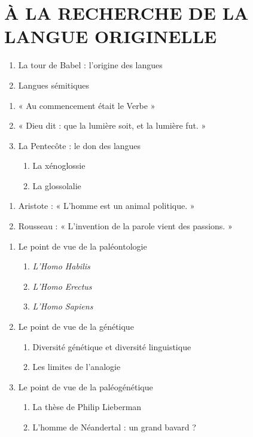 \chapter{À LA RECHERCHE DE LA LANGUE ORIGINELLE}
\begingroup\small{}\setlength{\parskip}{2pt}
\begin{enumerate}[label=\arabic*.]
\item La tour de Babel : l’origine des langues
\item Langues sémitiques
\end{enumerate}
\begin{enumerate}[label=\arabic*.]
\item « Au commencement était le Verbe »
\item « Dieu dit : que la lumière soit, et la lumière fut. »
\item La Pentecôte : le don des langues
\begin{enumerate}[label=\textbf{\arabic*},nosep]
\item La xénoglossie
\item La glossolalie
\end{enumerate}
\end{enumerate}
\begin{enumerate}[label=\arabic*.]
\item Aristote : « L’homme est un animal politique. »
\item Rousseau : « L’invention de la parole vient des passions. »
\end{enumerate}
\begin{enumerate}[label=\arabic*.]
\item Le point de vue de la paléontologie
\begin{enumerate}[label=\textbf{\arabic*},nosep]
\item \textit{L’Homo Habilis}
\item \textit{L’Homo Erectus}
\item \textit{L’Homo Sapiens}
\end{enumerate}
\item Le point de vue de la génétique
\begin{enumerate}[label=\textbf{\arabic*},nosep]
\item Diversité génétique et diversité linguistique
\item Les limites de l’analogie
\end{enumerate}
\item Le point de vue de la paléogénétique
\begin{enumerate}[label=\textbf{\arabic*},nosep]
\item La thèse de Philip Lieberman
\item L’homme de Néandertal : un grand bavard ?
\end{enumerate}
\end{enumerate}
